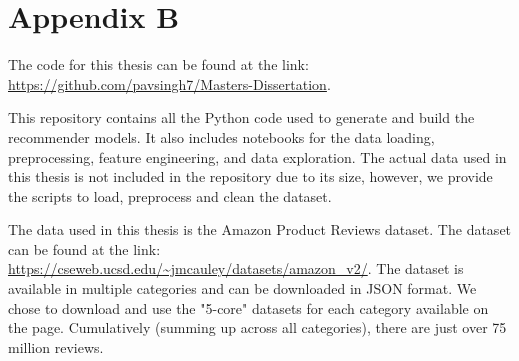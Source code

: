 
\chapter{Appendix B} %

\label{AppendixB} %

The code for this thesis can be found at the link: \url{https://github.com/pavsingh7/Masters-Dissertation}.

This repository contains all the Python code used to generate and build the recommender models. It also includes notebooks for the data loading, preprocessing, feature engineering, and data exploration. The actual data used in this thesis is not included in the repository due to its size, however, we provide the scripts to load, preprocess and clean the dataset. 

The data used in this thesis is the Amazon Product Reviews dataset. The dataset can be found at the link: \url{https://cseweb.ucsd.edu/~jmcauley/datasets/amazon_v2/}. The dataset is available in multiple categories and can be downloaded in JSON format. We chose to download and use the "5-core" datasets for each category available on the page. Cumulatively (summing up across all categories), there are just over 75 million reviews. 
